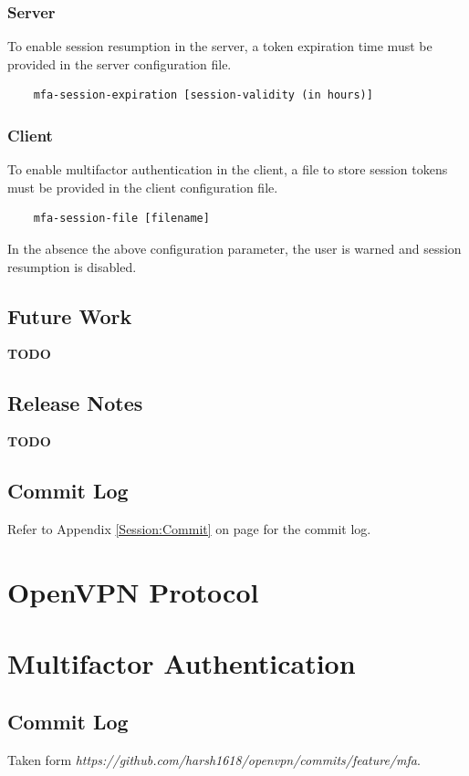 \documentclass[11pt,oneside]{book}
\begin{document}
\subsection{Server}
To enable session resumption in the server, a token expiration time must be provided in the server
configuration file.

\begin{verbatim}
    mfa-session-expiration [session-validity (in hours)]
\end{verbatim}

\subsection{Client}
To enable multifactor authentication in the client, a file to store session tokens must be provided
in the client configuration file.

\begin{verbatim}
    mfa-session-file [filename]
\end{verbatim}

\noindent
In the absence the above configuration parameter, the user is warned and session resumption is
disabled.

\section{Future Work}
\textbf{TODO}

\section{Release Notes}
\textbf{TODO}

\section{Commit Log}
Refer to Appendix \ref{Session:Commit} on page \pageref{Session:Commit} for the commit log.

\appendix
\chapter{OpenVPN Protocol}
\cite{OpenVPN_Security}
\label{OpenVPN:Protocol}


\chapter{Multifactor Authentication}
\label{MFA:Commit}
\section{Commit Log}
Taken form \emph{https://github.com/harsh1618/openvpn/commits/feature/mfa}.\\

\end{document}
